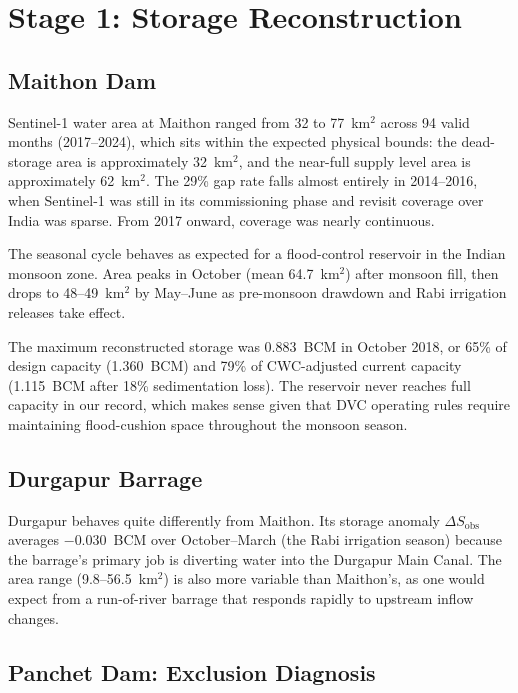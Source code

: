 \documentclass[12pt,a4paper,oneside]{report}
\newcommand{\dSobs}{\Delta S_{\mathrm{obs}}}
\begin{document}
\section{Stage 1: Storage Reconstruction}

\subsection{Maithon Dam}

Sentinel-1 water area at Maithon ranged from 32 to 77~km$^2$ across 94
valid months (2017--2024), which sits within the expected physical bounds:
the dead-storage area is approximately 32~km$^2$, and the near-full supply
level area is approximately 62~km$^2$. The 29\% gap rate falls almost
entirely in 2014--2016, when Sentinel-1 was still in its commissioning phase
and revisit coverage over India was sparse. From 2017 onward, coverage was
nearly continuous.

The seasonal cycle behaves as expected for a flood-control reservoir in the
Indian monsoon zone. Area peaks in October (mean 64.7~km$^2$) after monsoon
fill, then drops to 48--49~km$^2$ by May--June as pre-monsoon drawdown and
Rabi irrigation releases take effect.

The maximum reconstructed storage was 0.883~BCM in October 2018, or 65\% of
design capacity (1.360~BCM) and 79\% of CWC-adjusted current capacity
(1.115~BCM after 18\% sedimentation loss). The reservoir never reaches full
capacity in our record, which makes sense given that DVC operating rules
require maintaining flood-cushion space throughout the monsoon season.

\subsection{Durgapur Barrage}

Durgapur behaves quite differently from Maithon. Its storage anomaly
$\dSobs$ averages $-0.030$~BCM over October--March (the Rabi irrigation
season) because the barrage's primary job is diverting water into the
Durgapur Main Canal. The area range (9.8--56.5~km$^2$) is also more
variable than Maithon's, as one would expect from a run-of-river barrage
that responds rapidly to upstream inflow changes.

\subsection{Panchet Dam: Exclusion Diagnosis}
\end{document}
